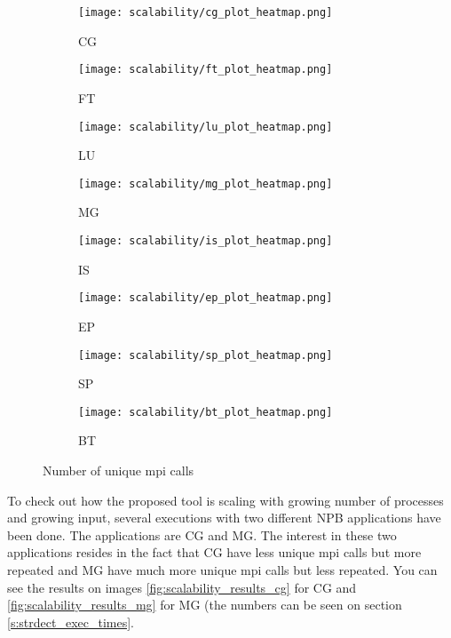 \begin{figure}
    \centering
    \begin{subfigure}[b]{0.3\textwidth}
        \texttt{[image: scalability/cg\_plot\_heatmap.png]}
        \caption{CG}
        \label{fig:cg_sca}
    \end{subfigure}
    \quad
    \begin{subfigure}[b]{0.3\textwidth}
        \texttt{[image: scalability/ft\_plot\_heatmap.png]}
        \caption{FT}
        \label{fig:ft_sca}
    \end{subfigure}
    \quad   
    \begin{subfigure}[b]{0.3\textwidth}
        \texttt{[image: scalability/lu\_plot\_heatmap.png]}
        \caption{LU}
        \label{fig:lu_sca}
    \end{subfigure}
    
    \begin{subfigure}[b]{0.3\textwidth}
        \texttt{[image: scalability/mg\_plot\_heatmap.png]}
        \caption{MG}
        \label{fig:mg_sca}
    \end{subfigure}
    \quad
    \begin{subfigure}[b]{0.3\textwidth}
        \texttt{[image: scalability/is\_plot\_heatmap.png]}
        \caption{IS}
        \label{fig:is_sca}
    \end{subfigure}
    \quad
    \begin{subfigure}[b]{0.3\textwidth}
        \texttt{[image: scalability/ep\_plot\_heatmap.png]}
        \caption{EP}
        \label{fig:ep_sca}
    \end{subfigure}
    
    \begin{subfigure}[b]{0.3\textwidth}
        \texttt{[image: scalability/sp\_plot\_heatmap.png]}
        \caption{SP}
        \label{fig:sp_sca}
    \end{subfigure}
    \quad
    \begin{subfigure}[b]{0.3\textwidth}
        \texttt{[image: scalability/bt\_plot\_heatmap.png]}
        \caption{BT}
        \label{fig:bt_sca}
    \end{subfigure}
    \quad
    \caption{Number of unique mpi calls}
    \label{fig:scalability_results}
\end{figure}

To check out how the proposed tool is scaling with growing number of processes
and growing input, several executions with two different NPB applications have
been done. The applications are CG and MG. The interest in these two
applications resides in the fact that CG have less unique mpi calls but more
repeated and MG have much more unique mpi calls but less repeated. You can see 
the results on images \ref{fig:scalability_results_cg} for CG and 
\ref{fig:scalability_results_mg} for MG (the numbers can be seen on section
\ref{s:strdect_exec_times}. 

